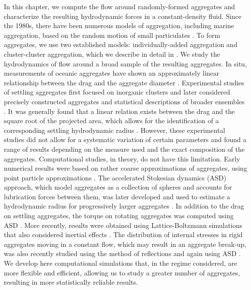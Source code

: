 In this chapter, we compute	the flow around randomly-formed aggregates and 
characterize the resulting hydrodynamic forces in a constant-density fluid.
Since the 1980s, there have been numerous models of aggregation, including marine aggregation, based on the random motion of small particulates 
\cite{rosenstock_cluster_1980, witten_diffusion-limited_1981,witten_tenuous_1986,kolb_anisotropic_1987}. To form aggregates, we use two established models: individually-added aggregation and cluster-cluster aggregation, which we describe in detail in \cite{yoo_hydrodynamic_2020}. 
We study the hydrodynamics of flow around a broad sample of the resulting aggregates.
In situ, measurements of oceanic aggregates have shown an approximately linear relationship between the drag and the aggregate diameter \cite{alldredge_situ_1988}. Experimental studies of settling aggregates first focused on inorganic clusters \cite{wiltzius_hydrodynamic_1987} and later considered precisely constructed aggregates \cite{takayasu_determination_1998} and statistical descriptions of broader ensembles \cite{johnson_settling_1996}. 
It was generally found that a linear relation exists between the drag and the square root of the projected area, which allows for the identification of a corresponding settling hydrodynamic radius \cite{johnson_settling_1996, tang_model_2002}.
However, these experimental studies did not allow for a systematic variation of certain parameters and found a range of results depending on the measure used and the exact composition of the aggregates.  Computational studies, in theory, do not have this limitation. Early numerical results were based on rather coarse approximations of aggregates, using point particle approximations \cite{chen_translational_1984}. The accelerated Stokesian dynamics (ASD) approach, which model aggregates as a collection of spheres and accounts for lubrication forces between them, was later developed \cite{brady_stokesian_1988} and used to estimate a hydrodynamic radius for progressively larger aggregates \cite{rogak_stokes_1990,bossis_hydrodynamic_1991}.
In addition to the drag on settling aggregates, the torque on rotating aggregates 
was computed using ASD \cite{binder_structural_2009}. More recently, results were obtained using Lattice-Boltzmann simulations that also considered inertial effects \cite{zhang_direct_2015}. The distribution of internal stresses in rigid aggregates moving in a constant flow, which may result in an aggregate break-up, was also recently studied using the method of reflections  \cite{gastaldi_distribution_2011} and again using ASD  \cite{vanni_accurate_2015}. We develop here 
computational simulations that, in the regime considered, are more flexible and efficient, allowing us to study a greater number of aggregates, resulting in more statistically reliable results. 


